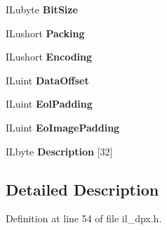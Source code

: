 \begin{DoxyCompactItemize}
\mbox{\label{structDPX__IMAGE__ELEMENT_a11214d8ad9331d0f51021dd56083d66f}} 
I\+Lubyte {\bfseries Bit\+Size}
\item 
\mbox{\label{structDPX__IMAGE__ELEMENT_af314aee5bcde49889e404c01f0ccf326}} 
I\+Lushort {\bfseries Packing}
\item 
\mbox{\label{structDPX__IMAGE__ELEMENT_ac39fb045dc8a50b84763a61a8004d738}} 
I\+Lushort {\bfseries Encoding}
\item 
\mbox{\label{structDPX__IMAGE__ELEMENT_a4d42e89ef0f83dfe6f0eb2a19f16d760}} 
I\+Luint {\bfseries Data\+Offset}
\item 
\mbox{\label{structDPX__IMAGE__ELEMENT_a8b90e8c16bfcba85cf0b626a48a8f46a}} 
I\+Luint {\bfseries Eol\+Padding}
\item 
\mbox{\label{structDPX__IMAGE__ELEMENT_aa9d27866665f20c6c777b399ba1427a6}} 
I\+Luint {\bfseries Eo\+Image\+Padding}
\item 
\mbox{\label{structDPX__IMAGE__ELEMENT_a707a01482f8df7fe8e73dd99b666af68}} 
I\+Lbyte {\bfseries Description} \mbox{[}32\mbox{]}
\end{DoxyCompactItemize}


\subsection{Detailed Description}


Definition at line 54 of file il\+\_\+dpx.\+h.



